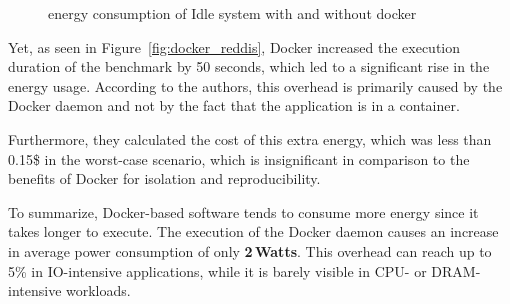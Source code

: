\begin{figure}
    \caption{energy consumption of Idle system with and without docker \cite{eddie_antonio_santos_how}}\label{fig:docker_idle}
\end{figure}

Yet, as seen in Figure~\ref{fig:docker_reddis}, Docker increased the execution duration of the benchmark by 50 seconds, which led to a significant rise in the energy usage.
According to the authors, this overhead is primarily caused by the Docker daemon and not by the fact that  the application is in a container.


Furthermore, they calculated the cost of this extra energy, which was less than 0.15\$ in the worst-case scenario, which is insignificant in comparison to the benefits of Docker for isolation and reproducibility.

To summarize, Docker-based software tends to consume more energy since it takes longer to execute.
The execution of the Docker daemon causes an increase in average power consumption of only \textbf{2\,Watts}.
This overhead can reach up to 5\% in IO-intensive applications, while it is barely visible in CPU- or DRAM-intensive workloads.

